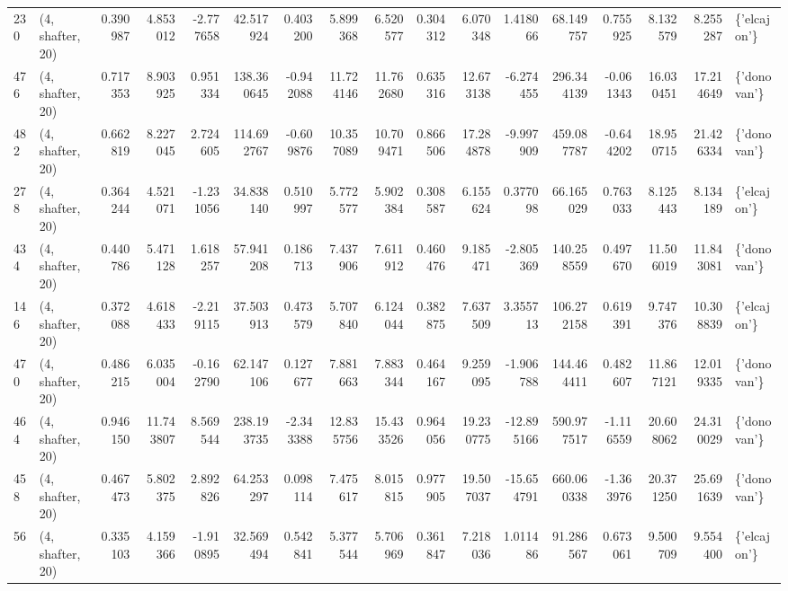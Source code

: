 \begin{tabular}{llrrrrrrrrrrrrrrl}
230 &  (4, shafter, 20) &   0.390987 &   4.853012 &  -2.777658 &    42.517924 &   0.403200 &   5.899368 &   6.520577 &  0.304312 &   6.070348 &   1.418066 &    68.149757 &   0.755925 &   8.132579 &   8.255287 &  \{'elcajon'\} \\
476 &  (4, shafter, 20) &   0.717353 &   8.903925 &   0.951334 &   138.360645 &  -0.942088 &  11.724146 &  11.762680 &  0.635316 &  12.673138 &  -6.274455 &   296.344139 &  -0.061343 &  16.030451 &  17.214649 &  \{'donovan'\} \\
482 &  (4, shafter, 20) &   0.662819 &   8.227045 &   2.724605 &   114.692767 &  -0.609876 &  10.357089 &  10.709471 &  0.866506 &  17.284878 &  -9.997909 &   459.087787 &  -0.644202 &  18.950715 &  21.426334 &  \{'donovan'\} \\
278 &  (4, shafter, 20) &   0.364244 &   4.521071 &  -1.231056 &    34.838140 &   0.510997 &   5.772577 &   5.902384 &  0.308587 &   6.155624 &   0.377098 &    66.165029 &   0.763033 &   8.125443 &   8.134189 &  \{'elcajon'\} \\
434 &  (4, shafter, 20) &   0.440786 &   5.471128 &   1.618257 &    57.941208 &   0.186713 &   7.437906 &   7.611912 &  0.460476 &   9.185471 &  -2.805369 &   140.258559 &   0.497670 &  11.506019 &  11.843081 &  \{'donovan'\} \\
146 &  (4, shafter, 20) &   0.372088 &   4.618433 &  -2.219115 &    37.503913 &   0.473579 &   5.707840 &   6.124044 &  0.382875 &   7.637509 &   3.355713 &   106.272158 &   0.619391 &   9.747376 &  10.308839 &  \{'elcajon'\} \\
470 &  (4, shafter, 20) &   0.486215 &   6.035004 &  -0.162790 &    62.147106 &   0.127677 &   7.881663 &   7.883344 &  0.464167 &   9.259095 &  -1.906788 &   144.464411 &   0.482607 &  11.867121 &  12.019335 &  \{'donovan'\} \\
464 &  (4, shafter, 20) &   0.946150 &  11.743807 &   8.569544 &   238.193735 &  -2.343388 &  12.835756 &  15.433526 &  0.964056 &  19.230775 & -12.895166 &   590.977517 &  -1.116559 &  20.608062 &  24.310029 &  \{'donovan'\} \\
458 &  (4, shafter, 20) &   0.467473 &   5.802375 &   2.892826 &    64.253297 &   0.098114 &   7.475617 &   8.015815 &  0.977905 &  19.507037 & -15.654791 &   660.060338 &  -1.363976 &  20.371250 &  25.691639 &  \{'donovan'\} \\
56  &  (4, shafter, 20) &   0.335103 &   4.159366 &  -1.910895 &    32.569494 &   0.542841 &   5.377544 &   5.706969 &  0.361847 &   7.218036 &   1.011486 &    91.286567 &   0.673061 &   9.500709 &   9.554400 &  \{'elcajon'\} \\

\end{tabular}
